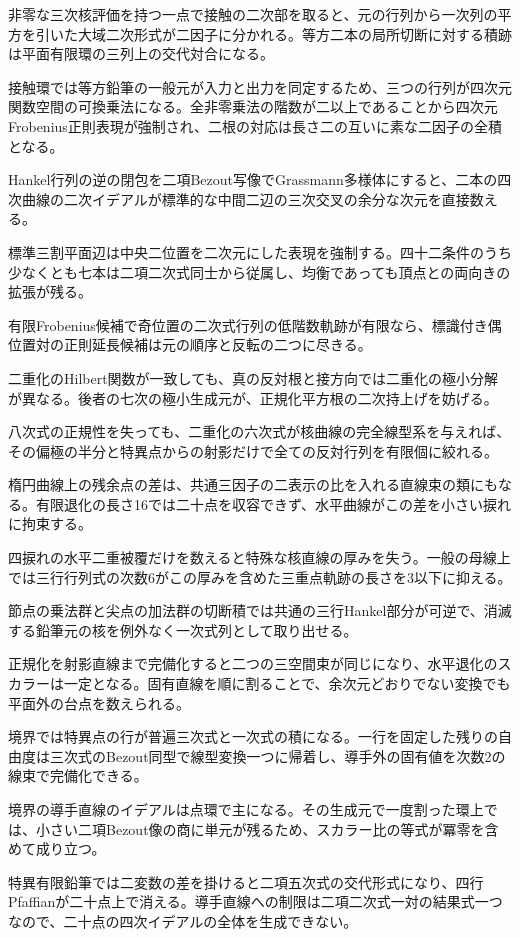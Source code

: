 \documentclass[11pt,a4paper]{ltjsarticle}
\begin{document}
非零な三次核評価を持つ一点で接触の二次部を取ると、元の行列から一次列の平方を引いた大域二次形式が二因子に分かれる。等方二本の局所切断に対する積跡は平面有限環の三列上の交代対合になる。

接触環では等方鉛筆の一般元が入力と出力を同定するため、三つの行列が四次元関数空間の可換乗法になる。全非零乗法の階数が二以上であることから四次元Frobenius正則表現が強制され、二根の対応は長さ二の互いに素な二因子の全積となる。

Hankel行列の逆の閉包を二項Bezout写像でGrassmann多様体にすると、二本の四次曲線の二次イデアルが標準的な中間二辺の三次交叉の余分な次元を直接数える。

標準三割平面辺は中央二位置を二次元にした表現を強制する。四十二条件のうち少なくとも七本は二項二次式同士から従属し、均衡であっても頂点との両向きの拡張が残る。

有限Frobenius候補で奇位置の二次式行列の低階数軌跡が有限なら、標識付き偶位置対の正則延長候補は元の順序と反転の二つに尽きる。

二重化のHilbert関数が一致しても、真の反対根と接方向では二重化の極小分解が異なる。後者の七次の極小生成元が、正規化平方根の二次持上げを妨げる。

八次式の正規性を失っても、二重化の六次式が核曲線の完全線型系を与えれば、その偏極の半分と特異点からの射影だけで全ての反対行列を有限個に絞れる。

楕円曲線上の残余点の差は、共通三因子の二表示の比を入れる直線束の類にもなる。有限退化の長さ16では二十点を収容できず、水平曲線がこの差を小さい捩れに拘束する。

四捩れの水平二重被覆だけを数えると特殊な核直線の厚みを失う。一般の母線上では三行行列式の次数6がこの厚みを含めた三重点軌跡の長さを3以下に抑える。

節点の乗法群と尖点の加法群の切断積では共通の三行Hankel部分が可逆で、消滅する鉛筆元の核を例外なく一次式列として取り出せる。

正規化を射影直線まで完備化すると二つの三空間束が同じになり、水平退化のスカラーは一定となる。固有直線を順に割ることで、余次元どおりでない変換でも平面外の台点を数えられる。

境界では特異点の行が普遍三次式と一次式の積になる。一行を固定した残りの自由度は三次式のBezout同型で線型変換一つに帰着し、導手外の固有値を次数2の線束で完備化できる。

境界の導手直線のイデアルは点環で主になる。その生成元で一度割った環上では、小さい二項Bezout像の商に単元が残るため、スカラー比の等式が冪零を含めて成り立つ。

特異有限鉛筆では二変数の差を掛けると二項五次式の交代形式になり、四行Pfaffianが二十点上で消える。導手直線への制限は二項二次式一対の結果式一つなので、二十点の四次イデアルの全体を生成できない。
\end{document}
